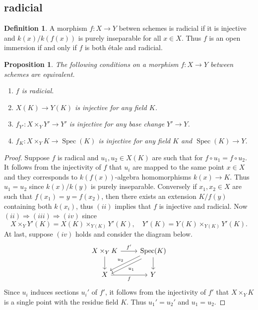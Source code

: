 \documentclass[leqno]{amsart}
\DeclareMathOperator{\Spec}{Spec}
\newcommand{\1}{\mathbf{1}}
\newtheorem{prop}[thm]{Proposition}
\theoremstyle{definition}
\newtheorem{defn}[thm]{Definition}
\theoremstyle{remark}
\begin{document}
\subsection{radicial}
\begin{defn}
	A morphism $f\colon X\to Y$
	betwen schemes is radicial if it is injective and
	$k(x)/k(f(x))$ is purely inseparable for all  $x\in X$.
	Thus
	$f$ is an open immersion if and only if
	$f$ is both  \'{e}tale and radicial.
\end{defn}
\begin{prop}
	The following conditions 
	on a morphism $f\colon X\to Y$
	between schemes are equivalent.
	 \begin{enumerate}[label=(\roman*)]
		\item $f$ is radicial.
		\item $X(K)\to Y(K)$ is injective 
			for any field $K$.
		\item $f_{Y'}\colon X\times_YY'\to Y'$ is injective
			for any base change
			$Y'\to Y$.
		\item $f_K\colon X\times_YK\to \Spec(K)$ 
			is injective for any field $K$ and
			$\Spec(K)\to Y$.
	\end{enumerate}
\end{prop}
\begin{proof}
	Suppose $f$ is radical
	and  $u_1,u_2\in X(K)$ are such that
	for  $f\circ u_1=f\circ u_2$.
	It follows from the injectivity of $f$
	that  $u_i$ are mapped to the same point  $x\in X$ 
	and they corresponds to 
	$k(f(x))$-algebra homomorphisms $k(x)\to K$.
	Thus $u_1=u_2$ since $k(x)/k(y)$ is purely inseparable.
	Conversely if
	$x_1,x_2\in X$ are such that  $f(x_1)=y=f(x_2)$,
	then there exists an extension  $K/f(y)$
	containing both  $k(x_i)$,
	thus  $(ii)$ implies that  $f$ is injective 
	and radicial.
	Now $(ii)\Longrightarrow (iii)\Longrightarrow(iv)$ since 
	\[
		X\times_YY'(K)=X(K)\times_{Y(K)}Y'(K),\quad
		Y'(K)=Y(K)\times_{Y(K)}Y'(K).
	\]
	At last, suppose $(iv)$ holds 
	and consider the diagram below.
	\[
		\begin{tikzcd}
			X\times_YK
			\arrow[r,"f'"]
			\arrow[d]
			& \Spec(K)
			\arrow[dl,shift left,"u_1"]
			\arrow[dl,shift right,"u_2",swap]
			\arrow[d]\\
			X \arrow[r,"f",swap]& Y
		\end{tikzcd}
	\]
	Since $u_i$ induces sections  $u_i'$ of  $f'$,
	it follows from the injectivity of  $f'$
	that  $X\times_YK$ is a single point with 
	the residue field  $K$.
	Thus  $u_1'=u_2'$ and  $u_1=u_2$.
\end{proof}
\end{document}
